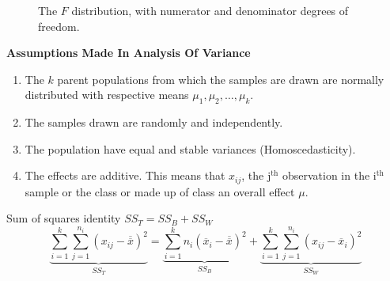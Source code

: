 \documentclass[11pt,a4paper]{article}
\theoremstyle{definition}
\begin{document}
\qquad 




\begin{figure}[H]
\centering
{}
\caption{The $F$ distribution, with numerator and denominator degrees of freedom.}
\end{figure}









\textbf{Assumptions Made In Analysis Of Variance}
\begin{enumerate}
\item The $k$ parent populations from which the samples are drawn are normally distributed with respective means $\mu_1, \mu_2, \ldots, \mu_k$.
\item The samples drawn are randomly and independently.
\item The population have equal and stable variances (Homoscedasticity). 
\item The effects are additive. This means that $x_{ij}$, the j$^{\text{th}}$ observation in the i$^{\text{th}}$ sample or the class or made up of class an overall effect $\mu$.\\
\end{enumerate}

Sum of squares identity $SS_T = SS_B + SS_W$
\[\underbrace{\sum_{i=1}^k \sum_{j=1}^{n_i}(x_{ij}-\overline{\overline{x}})^2}_{SS_T}
=\underbrace{\sum_{i=1}^k n_i(\overline{x}_i-\overline{\overline{x}})^2}_{SS_B}
+\underbrace{\sum_{i=1}^k\sum_{j=1}^{n_i}(x_{ij}-\overline{x}_i)^2}_{SS_W}\]
\end{document}
